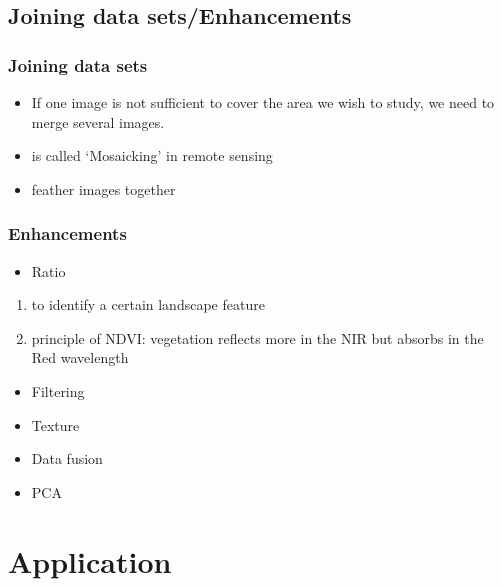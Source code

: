 \documentclass[
  letterpaper,
  DIV=11,
  numbers=noendperiod]{scrreprt}
\providecommand{\tightlist}{%
  \setlength{\itemsep}{0pt}\setlength{\parskip}{0pt}}\usepackage{longtable,booktabs,array}
\begin{document}
\hypertarget{joining-data-setsenhancements}{%
\subsection{Joining data
sets/Enhancements}\label{joining-data-setsenhancements}}

\hypertarget{joining-data-sets}{%
\subsubsection{Joining data sets}\label{joining-data-sets}}

\begin{itemize}
\tightlist
\item
  If one image is not sufficient to cover the area we wish to study, we
  need to merge several images.
\item
  is called `Mosaicking' in remote sensing
\item
  feather images together
\end{itemize}

\hypertarget{enhancements}{%
\subsubsection{Enhancements}\label{enhancements}}

\begin{itemize}
\tightlist
\item
  Ratio
\end{itemize}

\begin{enumerate}
\def\labelenumi{\arabic{enumi}.}
\tightlist
\item
  to identify a certain landscape feature
\item
  principle of NDVI: vegetation reflects more in the NIR but absorbs in
  the Red wavelength
\end{enumerate}

\begin{itemize}
\tightlist
\item
  Filtering
\item
  Texture
\item
  Data fusion
\item
  PCA
\end{itemize}

\hypertarget{application-1}{%
\section{Application}\label{application-1}}
\end{document}
